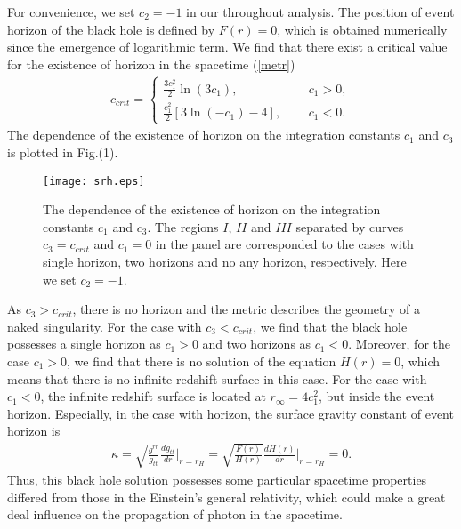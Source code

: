 \documentclass[aps,showpacs,preprintnumbers,amsmath,amssymb]{revtex4}
\begin{document}
For convenience, we set $c_2=-1$ in our throughout analysis. The position of event horizon of the black hole is defined by $F(r)=0$, which is obtained numerically since the emergence of logarithmic term. We find that there exist a critical value for
the existence of horizon in the spacetime (\ref{metr})
\begin{eqnarray}
 c_{crit}=\left\{\begin{array}{cc}
 \frac{3c^2_1}{2}\ln(3c_1),& \;\;\;\;\; c_1>0, \nonumber\\
 \frac{c^2_1}{2}[3\ln(-c_1)-4], & \;\;\;\;\;c_1<0.
 \end{array}\right.
 \label{crti1}
\end{eqnarray}
The dependence of the existence of horizon on the integration constants $c_1$ and $c_3$ is plotted in Fig.(1).
\begin{figure}[ht]
\begin{center}
\texttt{[image: srh.eps]}
\caption{The dependence of the existence of horizon on the integration constants $c_1$ and $c_3$. The regions $I$, $II$ and $III$ separated by curves $c_3=c_{crit}$ and $c_1=0$ in the panel are corresponded to the cases with single horizon, two horizons and no any horizon,
respectively.  Here we set $c_2=-1$.}
\end{center}
\end{figure}
As $c_3>c_{crit}$, there is no horizon and the metric describes the geometry of a naked singularity. For the case with $c_3<c_{crit}$, we find that the black hole possesses a single horizon as $c_1>0$ and two horizons as $c_1<0$. Moreover, for the case $c_1>0$, we find that there is no solution of the equation $H(r)=0$, which means that there is no infinite redshift surface in this case. For the case with $c_1<0$, the infinite redshift surface is located at
$r_{\infty}=4c^2_1$, but inside the event horizon. Especially, in the case with horizon, the  surface gravity constant of event horizon is
\begin{eqnarray}
\kappa=\sqrt{\frac{g^{rr}}{g_{tt}}}\frac{dg_{tt}}{dr}\bigg|_{r=r_H}=
\sqrt{\frac{F(r)}{H(r)}}\frac{d H(r)}{dr}\bigg|_{r=r_H}=0.
\end{eqnarray}
Thus, this black hole solution possesses some particular spacetime properties differed from those in the Einstein's general relativity, which could make a great deal influence on the propagation of photon in the spacetime.
\end{document}

